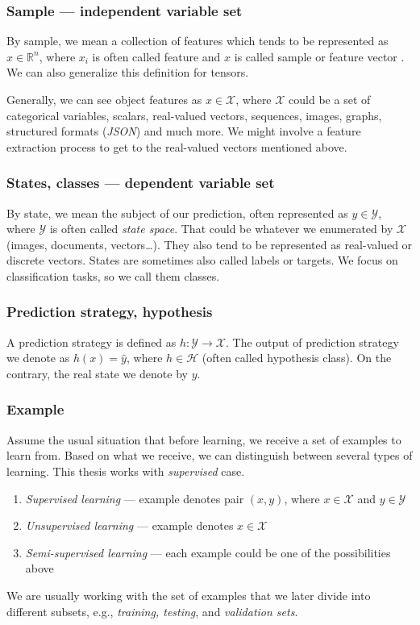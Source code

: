 \subsubsection*{Sample --- independent variable set}
By sample, we mean a collection of features which tends to be represented as $x\in\mathbb{R}^{n}$, where $x_i$ is often called feature and $x$ is called sample or feature vector \cite{GoodBengCour16}. We can also generalize this definition for tensors.

Generally, we can see object features as $x \in \mathcal{X}$, where $\mathcal{X}$ could be a set of categorical variables, scalars, real-valued vectors, sequences, images, graphs, structured formats (\emph{JSON}) and much more. We might involve a feature extraction process to get to the real-valued vectors mentioned above.

\subsubsection*{States, classes --- dependent variable set}
By state, we mean the subject of our prediction, often represented as $y \in \mathcal{Y}$, where $\mathcal{Y}$ is often called \emph{state space}. That could be whatever we enumerated by $\mathcal{X}$ (images, documents, vectors\dots). They also tend to be represented as real-valued or discrete vectors. States are sometimes also called labels or targets. We focus on classification tasks, so we call them classes.

\subsubsection*{Prediction strategy, hypothesis}
A prediction strategy is defined as $h:\mathcal{Y} \rightarrow \mathcal{X}$. The output of prediction strategy we denote as $h(x)=\hat{y}$, where $h\in\mathcal{H}$ (often called hypothesis class). On the contrary, the real state we denote by $y$. 

\subsubsection*{Example}
Assume the usual situation that before learning, we receive a set of examples to learn from. Based on what we receive, we can distinguish between several types of learning. This thesis works with \emph{supervised} case.\
\begin{enumerate}
    \itemsep0em 
    \item \emph{Supervised learning} --- example denotes pair $(x,y)$, where $x\in \mathcal{X}$ and $y\in \mathcal{Y}$
    \item \emph{Unsupervised learning} --- example denotes $x\in \mathcal{X}$
    \item \emph{Semi-supervised learning} --- each example could be one of the possibilities above
\end{enumerate}
We are usually working with the set of examples that we later divide into different subsets, e.g., \emph{training, testing}, and \emph{validation sets}.

